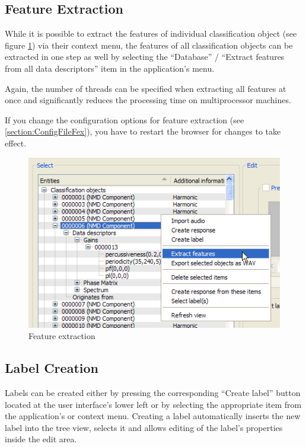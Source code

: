 \subsection{Feature Extraction}

While it is possible to extract the features of individual classification object
(see figure \ref{figure:FeatureExtraction}) via their context menu, the
features of all classification objects can be extracted in one step as well by
selecting the ``Database'' / ``Extract features from all data descriptors''
item in the application's menu.

Again, the number of threads can be specified when extracting all features at
once and significantly reduces the processing time on multiprocessor machines.

\begin{leftbar}
    If you change the configuration options for feature extraction (see
    \ref{section:ConfigFileFex}), you have to restart the browser for changes to
    take effect.
\end{leftbar}

\begin{figure}
    \includegraphics[width=.7\textwidth]{images/FeatureExtraction.png}
    \caption{%
        \label{figure:FeatureExtraction}%
        Feature extraction
    }
\end{figure}


\subsection{Label Creation}

Labels can be created either by pressing the corresponding ``Create label''
button located at the user interface's lower left or by selecting the
appropriate item from the application's or context menu. Creating a label
automatically inserts the new label into the tree view, selects it and allows
editing of the label's properties inside the edit area.


